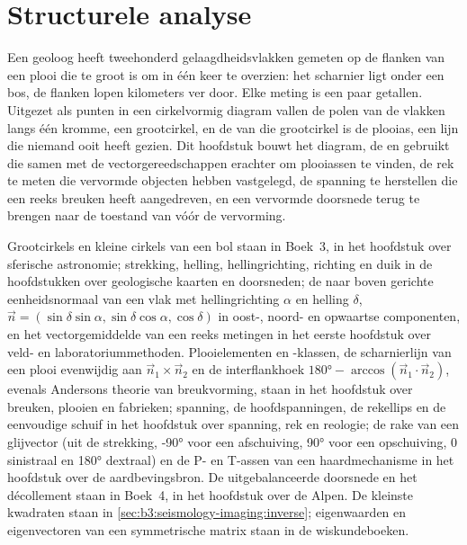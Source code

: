 \chapter{Structurele analyse}\label{ch:b3:structural-analysis}

Een geoloog heeft tweehonderd gelaagdheidsvlakken gemeten op de flanken van een plooi
die te groot is om in één keer te overzien: het scharnier ligt onder een bos, de flanken lopen kilometers ver
door. Elke meting is een paar getallen. Uitgezet als punten in een cirkelvormig diagram
vallen de polen van de vlakken langs één kromme, een grootcirkel, en
de  van die grootcirkel is de plooias, een lijn die niemand ooit heeft gezien.
Dit hoofdstuk bouwt het diagram, de  en gebruikt die
samen met de vectorgereedschappen erachter om plooiassen te vinden, de rek te meten
die vervormde objecten hebben vastgelegd, de spanning te herstellen die een reeks
breuken heeft aangedreven, en een vervormde doorsnede terug te brengen naar de toestand van vóór de
vervorming.

\begin{recall}
Grootcirkels en kleine cirkels van een bol staan in Boek~3, in het hoofdstuk
over sferische astronomie; strekking, helling, hellingrichting, richting en duik in de
hoofdstukken over geologische kaarten en doorsneden; de naar boven gerichte eenheidsnormaal van een
vlak met hellingrichting $\alpha$ en helling $\delta$, $\vec n = (\sin\delta
\sin\alpha, \sin\delta\cos\alpha, \cos\delta)$ in oost-, noord- en opwaartse
componenten, en het vectorgemiddelde van een reeks metingen in het eerste hoofdstuk over
veld- en laboratoriummethoden. Plooielementen en -klassen, de scharnierlijn van een
plooi evenwijdig aan $\vec n_1\times\vec n_2$ en de interflankhoek
$\ang{180} - \arccos(\vec n_1\cdot\vec n_2)$, evenals Andersons theorie van
breukvorming, staan in het hoofdstuk over breuken, plooien en fabrieken; spanning, de
hoofdspanningen, de rekellips en de eenvoudige schuif in het hoofdstuk over
spanning, rek en reologie; de rake van een glijvector (uit de strekking,
\ang{-90} voor een afschuiving, \ang{90} voor een opschuiving, 0 sinistraal en
\ang{180} dextraal) en de P- en T-assen van een haardmechanisme in het hoofdstuk over
de aardbevingsbron. De uitgebalanceerde doorsnede en het décollement staan in
Boek~4, in het hoofdstuk over de Alpen. De kleinste kwadraten staan in
\cref{sec:b3:seismology-imaging:inverse}; eigenwaarden en eigenvectoren van een
symmetrische matrix staan in de wiskundeboeken.
\end{recall}

